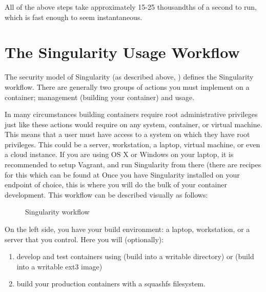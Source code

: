 \documentclass[letterpaper,10pt,english]{sphinxmanual}
\begin{document}
All of the above steps take approximately 15-25 thousandths of a second
to run, which is fast enough to seem instantaneous.


\section{The Singularity Usage Workflow}
\label{\detokenize{introduction:the-singularity-usage-workflow}}
The security model of Singularity (as described above, {\hyperref[\detokenize{introduction:security-and-privilege-escalation}]{}}) defines the
Singularity workflow. There are generally two groups of actions you
must implement on a container; management (building your container)
and usage.

In many circumstances building containers require root administrative
privileges just like these actions would require on any system,
container, or virtual machine. This means that a user must have access
to a system on which they have root privileges. This could be a
server, workstation, a laptop, virtual machine, or even a cloud
instance. If you are using OS X or Windows on your laptop, it is
recommended to setup Vagrant, and run Singularity from there (there
are recipes for this which can be found at Once you have Singularity
installed on your endpoint of choice, this is where you will do the
bulk of your container development. This workflow can be described
visually as follows:

\begin{figure}[htbp]
\centering
\capstart

\noindent{}
\caption{Singularity workflow}\label{\detokenize{introduction:id3}}\end{figure}

On the left side, you have your build environment: a laptop,
workstation, or a server that you control. Here you will (optionally):
\begin{enumerate}
\item {} 
develop and test containers using  (build into a writable directory)
or  (build into a writable ext3 image)

\item {} 
build your production containers with a squashfs filesystem.

\end{enumerate}
\end{document}
